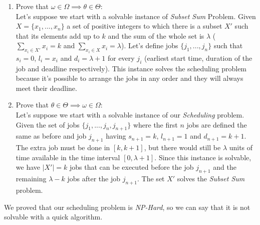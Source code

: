 \documentclass[11pt]{article}
\begin{document}
\begin{enumerate}
	\item Prove that $\omega \in \Omega \implies  \theta \in \Theta$: \\
	Let's suppose we start with a solvable instance of \textit{Subset Sum} Problem. Given $X = \{x_1, ..., x_n\}$ a set of positive integers to which there is a subset $X'$ such that its elements add up to $k$ and the sum of the whole set is $\lambda$ ($\sum\limits_{x_i \in X'}x_i = k$ and $\sum\limits_{x_i \in X}x_i = \lambda$). Let's define jobs $\{j_1, ..., j_n\}$ such that $s_i = 0$, $l_i = x_i$ and $d_i = \lambda + 1$ for every $j_i$ (earliest start time, duration of the job and deadline respectively). This instance solves the scheduling problem because it's possible to arrange the jobs in any order and they will always meet their deadline.
		
	\item Prove that $\theta \in \Theta \implies  \omega \in \Omega$: \\
	Let's suppose we start with a solvable instance of our \textit{Scheduling} problem. Given the set of jobs $\{j_1, ..., j_n, j_{n+1}\}$ where the first $n$ jobs are defined the same as before and job $j_{n+1}$ having $s_{n+1} = k$, $l_{n+1} = 1$ and $d_{n+1} = k+1$. The extra job must be done in $[k, k+1]$, but there would still be $\lambda$ units of time available in the time interval $[0, \lambda+1]$. Since this instance is solvable, we have $|X'| = k$ jobs that can be executed before the job $j_{n+1}$ and the remaining $\lambda - k$ jobs after the job $j_{n+1}$. The set $X'$ solves the \textit{Subset Sum} problem.
\end{enumerate}
We proved that our scheduling problem is \textit{NP-Hard}, so we can say that it is not solvable with a quick algorithm.
\end{document}
